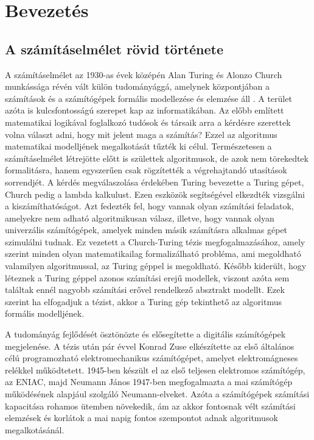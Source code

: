 \chapter{Bevezetés}
\label{ch:intro}

\section{A számításelmélet rövid története}
A számításelmélet az 1930-as évek középén Alan Turing és Alonzo Church munkássága révén vált külön tudományággá, amelynek központjában a számítások és a számítógépek formális modellezése és elemzése áll \cite{savage2008modelsofcomp}. A terület azóta is kulcsfontosságú szerepet kap az informatikában. Az előbb említett matematikai logikával foglalkozó tudósok és társaik arra a kérdésre szerettek volna választ adni, hogy mit jelent maga a számítás? Ezzel az algoritmus matematikai modelljének megalkotását tűzték ki célul. Természetesen a számításelmélet létrejötte előtt is születtek algoritmusok, de azok nem törekedtek formalitásra, hanem egyszerűen csak rögzítették a végrehajtandó utasítások sorrendjét. A kérdés megválaszolása érdekében Turing bevezette a Turing gépet, Church pedig a lambda kalkulust. Ezen eszközök segítségével elkezdték vizsgálni a kiszámíthatóságot. Azt fedezték fel, hogy vannak olyan számítási feladatok, amelyekre nem adható algoritmikusan válasz, illetve, hogy vannak olyan univerzális számítógépek, amelyek minden másik számításra alkalmas gépet szimulálni tudnak.
Ez vezetett a Church-Turing tézis megfogalmazásához, amely szerint minden olyan matematikailag formalizálható probléma, ami megoldható valamilyen algoritmussal, az Turing géppel is megoldható. Később kiderült, hogy léteznek a Turing géppel azonos számítási erejű modellek, viszont azóta sem találtak ennél nagyobb számítási erővel rendelkező absztrakt modellt. Ezek szerint ha elfogadjuk a tézist, akkor a Turing gép tekinthető az algoritmus formális modelljének.

A tudományág fejlődését ösztönözte és elősegítette a digitális számítógépek megjelenése. A tézis után pár évvel Konrad Zuse elkészítette az első általános célú programozható elektromechanikus számítógépet, amelyet elektromágneses relékkel működtetett. 1945-ben készült el az első teljesen elektromos számítógép, az ENIAC, majd Neumann János 1947-ben megfogalmazta a mai számítógép működésének alapjául szolgáló Neumann-elveket. Azóta a számítógépek számítási kapacitása rohamos ütemben növekedik, ám az akkor fontosnak vélt számítási elemzések és korlátok a mai napig fontos szempontot adnak algoritmusok megalkotásánál.


